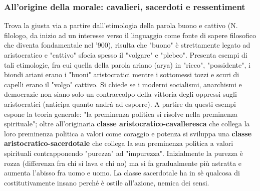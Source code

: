 \documentclass[10pt,a4paper]{article}
\begin{document}
\subsubsection{All'origine della morale: cavalieri, sacerdoti e ressentiment}
Trova la giusta via a partire dall'etimologia della parola buono e cattivo (N. filologo, da inizio ad un interesse verso il linguaggio come fonte di sapere filosofico che diventa fondamentale nel '900), risulta che "buono" è strettamente legato ad aristocratico e "cattivo" sfocia spesso il "volgare" e "plebeo". Presenta esempi di tali etimologie, fra cui quella della parola ariano (arya) in "ricco", "possidente", i biondi ariani erano i "buoni" aristocratici mentre i sottomessi tozzi e scuri di capelli erano il "volgo" cattivo. Si chiede se i moderni socialismi, anarchismi e democrazie non siano solo un contraccolpo della vittoria degli oppressi sugli aristocratici (anticipa quanto andrà ad esporre). A partire da questi esempi espone la teoria generale: "la preminenza politica si risolve nella preminenza spirituale"; oltre all'originaria\textbf{ classe aristocratico-cavalleresca} che collega la loro preminenza politica a valori come coraggio e potenza si sviluppa una \textbf{classe aristocratico-sacerdotale} che collega la sua preminenza politica a valori spirituali contrapponendo "purezza" ad "impurezza". Inizialmente la purezza è rozza (differenza fra chi si lava e chi no) ma si fa gradualmente più astratta e aumenta l'abisso fra uomo e uomo. La classe sacerdotale ha in sè qualcosa di costitutivamente insano perché è ostile all'azione, nemica dei sensi.\\
\end{document}

